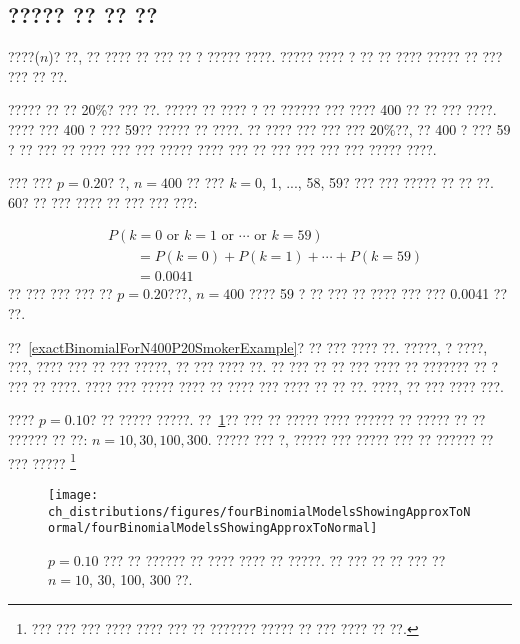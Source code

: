 

\subsection{????? ?? ?? ??}


????($n$)? ??, ?? ???? ?? ??? ?? ? ????? ????. ????? ???? ? ?? ?? ???? ????? ?? ??? ??? ?? ??.

\begin{example}{
????? ?? ?? 20\%? ??? ??. ????? ?? ???? ? ?? ?????? ??? ???? 400 ?? ?? ??? ????. ???? ??? 400 ? ???  59?? ????? ?? ????. ?? ???? ??? ??? ??? 20\%??, ?? 400 ? ??? 59 ? ?? ??? ?? ???? ??? ??? ????? }\label{exactBinomialForN400P20SmokerExample}
???? ??? ?? ??? ??? ??? ??? ????? ????.

??? ??? $p=0.20$? ?, $n=400$ ?? ??? $k=0$, 1, ..., 58, 59? ??? ??? ????? ?? ?? ??. 60? ?? ??? ???? ?? ??? ??? ???:

\begin{align*}
&P(k=0\text{ or }k=1\text{ or }\cdots\text{ or } k=59) \\
	&\qquad= P(k=0) + P(k=1) + \cdots + P(k=59) \\
	&\qquad=0.0041
\end{align*}
?? ??? ??? ??? ?? $p=0.20$???, $n=400$ ????  59 ? ?? ??? ?? ???? ??? ??? 0.0041 ?? ??.
\end{example}

??~\ref{exactBinomialForN400P20SmokerExample}? ?? ??? ???? ??. ?????, ? ????, ???, ???? ??? ?? ??? ?????, ?? ??? ???? ??. ?? ??? ?? ?? ??? ???? ?? ??????? ?? ? ??? ?? ????. ???? ??? ????? ???? ?? ???? ??? ???? ?? ?? ??. ????, ?? ??? ???? ???. 

\begin{exercise}
???? $p=0.10$? ?? ????? ?????. ??~\ref{fourBinomialModelsShowingApproxToNormal}?? ??? ?? ????? ???? ?????? ?? ????? ?? ?? ?????? ?? ??: $n=10, 30, 100, 300$. ????? ??? ?, ????? ??? ????? ??? ?? ?????? ?? ??? ?????
\footnote{??? ??? ??? ???? ???? ??? ?? ??????? ????? ?? ??? ???? ?? ??.}
\end{exercise}

\begin{figure}[h]
\centering
\texttt{[image: ch\_distributions/figures/fourBinomialModelsShowingApproxToNormal/fourBinomialModelsShowingApproxToNormal]}
\caption{$p=0.10$ ??? ?? ?????? ?? ???? ???? ?? ?????. ?? ??? ?? ?? ??? ?? $n=10$, 30, 100, 300 ??.}
\label{fourBinomialModelsShowingApproxToNormal}
\end{figure}

